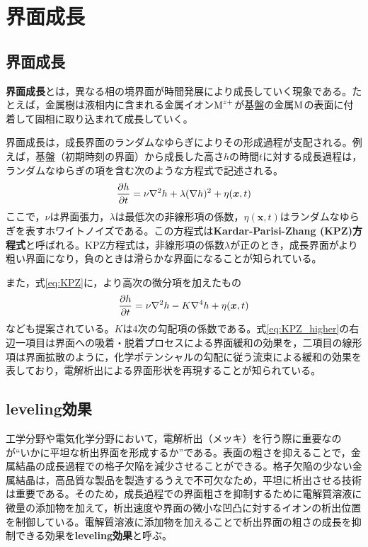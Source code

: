 \documentclass[autodetect-engine,dvi=dvipdfmx,a4paper,ja=standard,oneside,openany,11pt]{bxjsbook}
\begin{document}
\section{界面成長}
\subsection{界面成長}
\textbf{界面成長}とは，異なる相の境界面が時間発展により成長していく現象である。たとえば，金属樹は液相内に含まれる金属イオン$\ce{M^{z+}}$が基盤の金属$\ce{M}$の表面に付着して固相に取り込まれて成長していく。

界面成長は，成長界面のランダムなゆらぎによりその形成過程が支配される。例えば，基盤（初期時刻の界面）から成長した高さ$h$の時間$t$に対する成長過程は，ランダムなゆらぎの項を含む次のような方程式で記述される\cite{kardar1987scaling}。
\begin{equation}
  \pdv{h}{t}=\nu\nabla^2h+\lambda(\nabla h)^2+\eta(\bm{x},t)
  \label{eq:KPZ}
\end{equation}
ここで，$\nu$は界面張力，$\lambda$は最低次の非線形項の係数，$\eta(\bm{x},t)$はランダムなゆらぎを表すホワイトノイズである。この方程式は\textbf{Kardar-Parisi-Zhang (KPZ)方程式}と呼ばれる。KPZ方程式は，非線形項の係数$\lambda$が正のとき，成長界面がより粗い界面になり，負のときは滑らかな界面になることが知られている。

また，式\eqref{eq:KPZ}に，より高次の微分項を加えたもの\cite{wolf1990growth}
\begin{equation}
  \pdv{h}{t}=\nu\nabla^2h-K\nabla^4h+\eta(\bm{x},t)
  \label{eq:KPZ_higher}
\end{equation}
なども提案されている。$K$は4次の勾配項の係数である。式\eqref{eq:KPZ_higher}の右辺一項目は界面への吸着・脱着プロセスによる界面緩和の効果を，二項目の線形項は界面拡散のように，化学ポテンシャルの勾配に従う流束による緩和の効果を表しており，電解析出による界面形状を再現することが知られている。

\subsection{leveling効果}
工学分野や電気化学分野において，電解析出（メッキ）を行う際に重要なのが``いかに平坦な析出界面を形成するか''である。表面の粗さを抑えることで，金属結晶の成長過程での格子欠陥を減少させることができる。格子欠陥の少ない金属結晶は，高品質な製品を製造するうえで不可欠なため，平坦に析出させる技術は重要である。そのため，成長過程での界面粗さを抑制するために電解質溶液に微量の添加物を加えて，析出速度や界面の微小な凹凸に対するイオンの析出位置を制御している。電解質溶液に添加物を加えることで析出界面の粗さの成長を抑制できる効果を\textbf{leveling効果}と呼ぶ。
\end{document}
